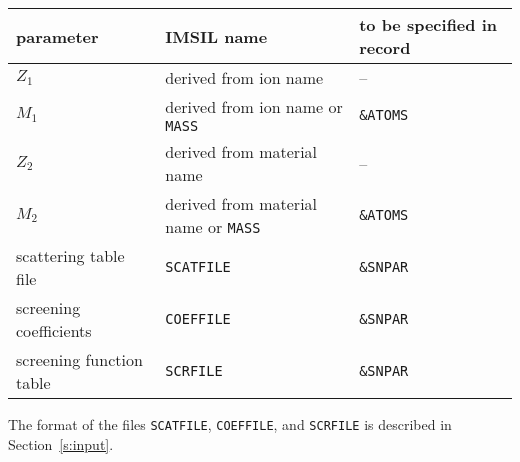 \begin{center}
\begin{tabular}{lll}
   parameter \quad & IMSIL name \qquad\qquad & to be specified in record \\
   \hline
   $Z_1$           & derived from ion name      & -- \\
   $M_1$           & derived from ion name or 
                     \texttt{MASS}              & \texttt{\&ATOMS} \\
   $Z_2$           & derived from material name & -- \\
   $M_2$           & derived from material name or
                     \texttt{MASS}              & \texttt{\&ATOMS} \\
   scattering 
   table file      & \texttt{SCATFILE}          & \texttt{\&SNPAR} \\
   screening
   coefficients    & \texttt{COEFFILE}          & \texttt{\&SNPAR} \\
   screening 
   function table  & \texttt{SCRFILE}           & \texttt{\&SNPAR} \\
\end{tabular}
\end{center}

The format of the files \texttt{SCATFILE}, \texttt{COEFFILE}, and 
\texttt{SCRFILE} is described in Section~\ref{s:input}. 

